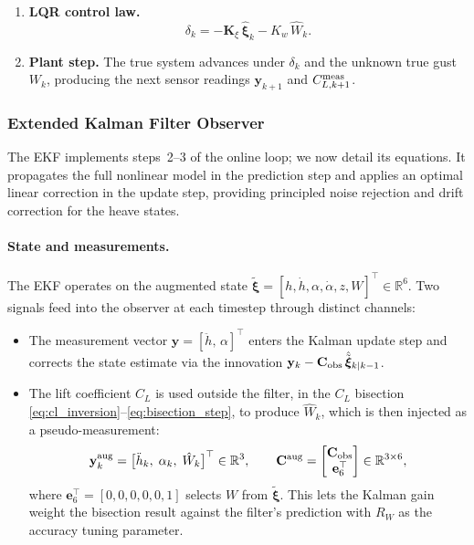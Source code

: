 \documentclass[11pt,a4paper]{article}
\newcommand{\vxi}{\bm{\xi}}
\newcommand{\mK}{\mathbf{K}}
\begin{document}
\begin{enumerate}
  \item \textbf{LQR control law.}
        \begin{equation}
          \delta_k = -\mK_\xi\,\hat{\vxi}_k - K_w\,\hat{W}_k.
          \label{eq:law}
        \end{equation}

  \item \textbf{Plant step.}
        The true system advances under $\delta_k$ and the unknown true gust
        $W_k$, producing the next sensor readings $\mathbf{y}_{k+1}$ and
        $C_{L,k+1}^{\rm meas}$.
\end{enumerate}

\subsubsection{Extended Kalman Filter Observer}
\label{sec:ekf}

The EKF implements steps~2--3 of the online loop; we now detail its equations.
It propagates the full nonlinear model in the prediction step and applies an
optimal linear correction in the update step, providing principled noise
rejection and drift correction for the heave states.

\paragraph{State and measurements.}
The EKF operates on the augmented state
$\tilde{\vxi} = [h,\dot{h},\alpha,\dot{\alpha},z,W]^\top \in \mathbb{R}^6$.
Two signals feed into the observer at each timestep through distinct channels:
\begin{itemize}
  \item The measurement vector $\mathbf{y} = [\ddot{h},\,\alpha]^\top$
        enters the Kalman update step and corrects the state estimate via the
        innovation $\mathbf{y}_k - \mathbf{C}_{\rm obs}\,\hat{\tilde{\vxi}}_{k|k-1}$.
  \item The lift coefficient $C_L$ is used outside the filter, in the $C_L$
        bisection \eqref{eq:cl_inversion}--\eqref{eq:bisection_step}, to
        produce $\hat{W}_k$, which is then injected as a pseudo-measurement:
        \begin{equation}
          \mathbf{y}^{\rm aug}_k
          = \bigl[\ddot{h}_k,\;\alpha_k,\;\hat{W}_k\bigr]^\top \in \mathbb{R}^3,
          \qquad
          \mathbf{C}^{\rm aug} =
          \begin{bmatrix} \mathbf{C}_{\rm obs} \\ \mathbf{e}_6^\top \end{bmatrix}
          \in \mathbb{R}^{3\times6},
          \label{eq:aug_meas}
        \end{equation}
        where $\mathbf{e}_6^\top = [0,0,0,0,0,1]$ selects $W$ from
        $\tilde{\vxi}$.
        This lets the Kalman gain weight the bisection result against the
        filter's prediction with $R_W$ as the accuracy tuning parameter.
\end{itemize}
\end{document}
